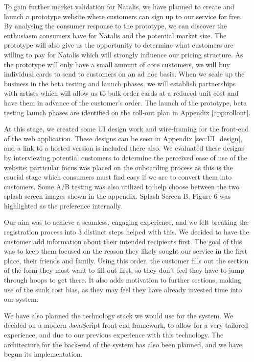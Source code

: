 \documentclass[10pt,a4paper]{article}
\begin{document}
To gain further market validation for Natalis, we have planned to create and launch a prototype website where customers can sign up to our service for free. By analysing the consumer response to the prototype, we can discover the enthusiasm consumers have for Natalis and the potential market size. The prototype will also give us the opportunity to determine what customers are willing to pay for Natalis which will strongly influence our pricing structure. As the prototype will only have a small amount of core customers, we will buy individual cards to send to customers on an ad hoc basis. When we scale up the business in the beta testing and launch phases, we will establish partnerships with artists which will allow us to bulk order cards at a reduced unit cost and have them in advance of the customer's order. The launch of the prototype, beta testing launch phases are identified on the roll-out plan in Appendix \ref{app:rollout}.

At this stage, we created some UI design work and wire-framing for the front-end of the web application. These designs can be seen in Appendix \ref{sec:UI_design}, and a link to a hosted version is included there also. We evaluated these designs by interviewing potential customers to determine the perceived ease of use of the website; particular focus was placed on the onboarding process as this is the crucial stage which consumers must find easy if we are to convert them into customers. Some A/B testing was also utilized to help choose between the two splash screen images shown in the appendix. Splash Screen B, Figure 6 was highlighted as the preference internally. 

Our aim was to achieve a seamless, engaging experience, and we felt breaking the registration process into 3 distinct steps helped with this. We decided to have the customer add information about their intended recipients first. The goal of this was to keep them focused on the reason they likely sought our service in the first place, their friends and family. Using this order, the customer fills out the section of the form they most want to fill out first, so they don't feel they have to jump through hoops to get there. It also adds motivation to further sections, making use of the sunk cost bias, as they may feel they have already invested time into our system.

We have also planned the technology stack we would use for the system. We decided on a modern JavaScript front-end framework, to allow for a very tailored experience, and due to our previous experience with this technology. The architecture for the back-end of the system has also been planned, and we have begun its implementation.
\end{document}

